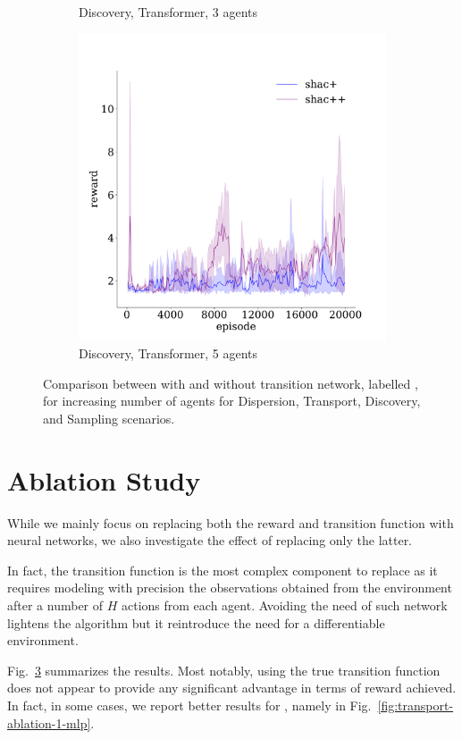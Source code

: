 \begin{figure}[!t]
\begin{subfigure}[b]{0.32\textwidth}
        \caption{Discovery, Transformer, 3 agents}
        \label{fig:discovery-ablation-transformer-3}
    \end{subfigure}
    \begin{subfigure}[b]{0.32\textwidth}
        \includegraphics[width=\textwidth]{figs/discovery-ablation-5-transformer.pdf}
        \caption{Discovery, Transformer, 5 agents}
        \label{fig:discovery-ablation-transformer-5}
    \end{subfigure}

    \caption{Comparison between \fname{} with and without transition network, labelled \fnamer{}, for increasing number of agents for Dispersion, Transport, Discovery, and Sampling scenarios.}
    \label{fig:ablation}
\end{figure}




\section{Ablation Study}\label{sect:ablation}
While we mainly focus on replacing both the reward and transition function with neural networks, we also investigate the effect of replacing only the latter. 

In fact, the transition function is the most complex component to replace as it requires modeling with precision the observations obtained from the environment after a number of $H$ actions from each agent. Avoiding the need of such network lightens the algorithm but it reintroduce the need for a differentiable environment.

Fig.~\ref{fig:ablation} summarizes the results. Most notably, using the true transition function does not appear to provide any significant advantage in terms of reward achieved. In fact, in some cases, we report better results for \fname{}, namely in Fig.~\ref{fig:transport-ablation-1-mlp}. 
